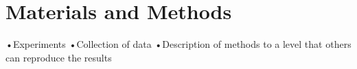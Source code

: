 \section{Materials and Methods}

•Experiments
•Collection of data
•Description of methods to a level that others can reproduce the results